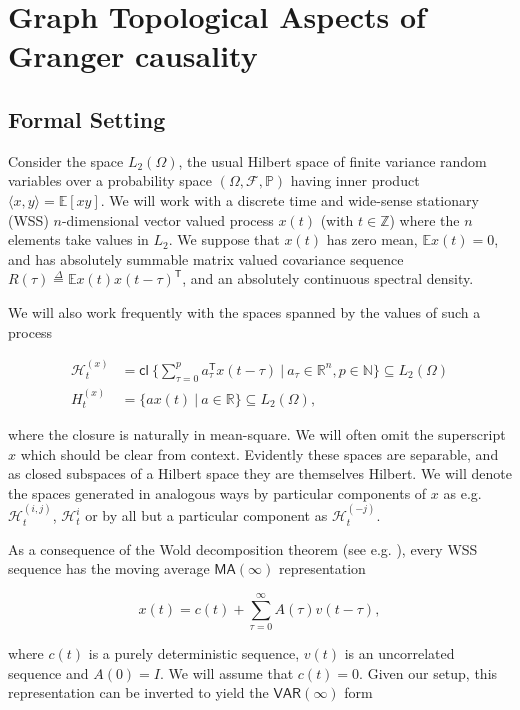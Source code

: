 \documentclass{statsoc}
\def\VAR{\mathsf{VAR}}  %
\def\MA{\mathsf{MA}}  %
\def\H{\mathcal{H}}  %
\def\cl{\mathsf{cl\ }}  %
\def\H{\mathcal{H}}  %
\def\E{\mathbb{E}}  %
\def\Z{\mathbb{Z}}  %
\def\R{\mathbb{R}}  %
\def\N{\mathbb{N}}  %
\def\T{\mathsf{T}}  %
\newcommand{\inner}[2]{\langle #1, #2 \rangle}  %
\begin{document}
\section{Graph Topological Aspects of Granger causality}
\label{sec:theory}
\subsection{Formal Setting}
Consider the space $L_2(\Omega)$, the usual Hilbert space of finite
variance random variables over a probability space
$(\Omega, \mathcal{F}, \mathbb{P})$ having inner product
$\inner{x}{y} = \E[xy]$.  We will work with a discrete time and
wide-sense stationary (WSS) $n$-dimensional vector valued process
$x(t)$ (with $t \in \Z$) where the $n$ elements take values in $L_2$.
We suppose that $x(t)$ has zero mean, $\E x(t) = 0$, and has
absolutely summable matrix valued covariance sequence
$R(\tau) \overset{\Delta}{=} \E x(t)x(t - \tau)^\T$, and an absolutely continuous
spectral density.

We will also work frequently with the spaces spanned by the values of
such a process

\begin{equation}
  \label{eq:hilbert_space_defn}
  \begin{aligned}
    \H_t^{(x)} &= \cl \{\sum_{\tau = 0}^p a_\tau^\T x(t - \tau)\ |\ a_\tau \in \R^n, p \in \N\} \subseteq L_2(\Omega)\\
    H_t^{(x)} &= \{a x(t)\ |\ a \in \R\} \subseteq L_2(\Omega),
  \end{aligned}
\end{equation}

where the closure is naturally in mean-square.  We will often omit the
superscript $x$ which should be clear from context.  Evidently these
spaces are separable, and as closed subspaces of a Hilbert space they
are themselves Hilbert.  We will denote the spaces generated in
analogous ways by particular components of $x$ as e.g.
$\H_t^{(i, j)}$, $\H_t^{i}$ or by all but a particular component as
$\H_t^{(-j)}$.

As a consequence of the Wold decomposition theorem (see
e.g. \cite{lindquist}), every WSS sequence has the moving average
$\MA(\infty)$ representation

\begin{equation}
  \label{eqn:wold}
  x(t) = c(t) + \sum_{\tau = 0}^\infty A(\tau) v(t - \tau),
\end{equation}

where $c(t)$ is a purely deterministic sequence, $v(t)$ is an
uncorrelated sequence and $A(0) = I$.  We will assume that $c(t) = 0$.
Given our setup, this representation can be inverted to yield the
$\VAR(\infty)$ form
\end{document}
